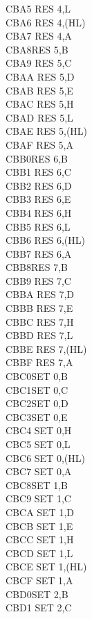 \documentclass[twoside,openright,a4paper]{book}
\begin{document}
\begin{multicols}{3}
{\begin{tabbing}
	CBA5\> 	RES 4,L\\
	CBA6\> 	RES 4,(HL)\\
	CBA7\> 	RES 4,A\\
	CBA8\>RES 5,B\\
	CBA9\> 	RES 5,C\\
	CBAA\> 	RES 5,D\\
	CBAB\> 	RES 5,E\\
	CBAC\> 	RES 5,H\\
	CBAD\> 	RES 5,L\\
	CBAE\> 	RES 5,(HL)\\
	CBAF\> 	RES 5,A\\
	CBB0\>RES 6,B\\
	CBB1\> 	RES 6,C\\
	CBB2\> 	RES 6,D\\
	CBB3\> 	RES 6,E\\
	CBB4\> 	RES 6,H\\
	CBB5\> 	RES 6,L\\
	CBB6\> 	RES 6,(HL)\\
	CBB7\> 	RES 6,A\\
	CBB8\>RES 7,B\\
	CBB9\> 	RES 7,C\\
	CBBA\> 	RES 7,D\\
	CBBB\> 	RES 7,E\\
	CBBC\> 	RES 7,H\\
	CBBD\> 	RES 7,L\\
	CBBE\> 	RES 7,(HL)\\
	CBBF\> 	RES 7,A\\
	CBC0\>SET 0,B\\
	CBC1\>SET 0,C\\
	CBC2\>SET 0,D\\
	CBC3\>SET 0,E\\
	CBC4\> 	SET 0,H\\
	CBC5\> 	SET 0,L\\
	CBC6\> 	SET 0,(HL)\\
	CBC7\> 	SET 0,A\\
	CBC8\>SET 1,B\\
	CBC9\> 	SET 1,C\\
	CBCA\> 	SET 1,D\\
	CBCB\> 	SET 1,E\\
	CBCC\> 	SET 1,H\\
	CBCD\> 	SET 1,L\\
	CBCE\> 	SET 1,(HL)\\
	CBCF\> 	SET 1,A\\
	CBD0\>SET 2,B\\
	CBD1\> 	SET 2,C\\

\end{tabbing}}
\end{multicols}
\end{document}
